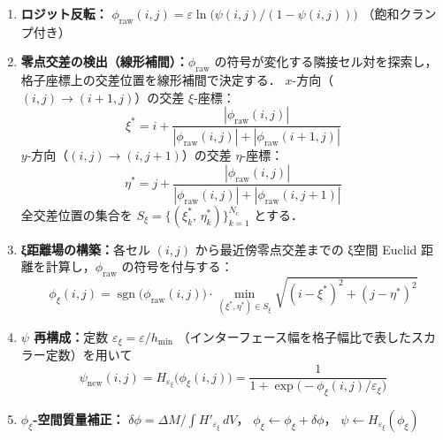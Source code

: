 \begin{tcolorbox}[algbox, title={ξ-SDF 再初期化アルゴリズム (Strategy B)}]
\begin{enumerate}
  \item \textbf{ロジット反転：}
        $\phi_{\mathrm{raw}}(i,j) = \varepsilon\ln\!\bigl(\psi(i,j)/(1{-}\psi(i,j))\bigr)$
        （飽和クランプ付き）
  \item \textbf{零点交差の検出（線形補間）：}$\phi_{\mathrm{raw}}$ の符号が変化する隣接セル対を探索し，
        格子座標上の交差位置を線形補間で決定する．
        $x$-方向（$(i,j)\to(i{+}1,j)$）の交差 $\xi$-座標：
        \begin{equation}
          \xi^* = i + \frac{|\phi_{\mathrm{raw}}(i,j)|}{|\phi_{\mathrm{raw}}(i,j)| + |\phi_{\mathrm{raw}}(i{+}1,j)|}
          \label{eq:xi_crossing_x}
        \end{equation}
        $y$-方向（$(i,j)\to(i,j{+}1)$）の交差 $\eta$-座標：
        \begin{equation}
          \eta^* = j + \frac{|\phi_{\mathrm{raw}}(i,j)|}{|\phi_{\mathrm{raw}}(i,j)| + |\phi_{\mathrm{raw}}(i,j{+}1)|}
          \label{eq:xi_crossing_y}
        \end{equation}
        全交差位置の集合を $S_\xi = \{(\xi^*_k,\,\eta^*_k)\}_{k=1}^{N_c}$ とする．
  \item \textbf{ξ距離場の構築：}各セル $(i,j)$ から最近傍零点交差までの
        ξ空間 Euclid 距離を計算し，$\phi_{\mathrm{raw}}$ の符号を付与する：
        \begin{equation}
          \phi_\xi(i,j) = \operatorname{sgn}\!\bigl(\phi_{\mathrm{raw}}(i,j)\bigr)
          \cdot \min_{(\xi^*,\eta^*)\in S_\xi}
          \sqrt{(i-\xi^*)^2 + (j-\eta^*)^2}
          \label{eq:xi_sdf}
        \end{equation}
  \item \textbf{$\psi$ 再構成：}定数 $\varepsilon_\xi = \varepsilon/h_{\min}$
        （インターフェース幅を格子幅比で表したスカラー定数）を用いて
        \begin{equation}
          \psi_{\mathrm{new}}(i,j) = H_{\varepsilon_\xi}\!\bigl(\phi_\xi(i,j)\bigr)
          = \frac{1}{1+\exp\!\bigl(-\phi_\xi(i,j)/\varepsilon_\xi\bigr)}
          \label{eq:xi_sdf_psi}
        \end{equation}
  \item \textbf{$\phi_\xi$-空間質量補正：}
        $\delta\phi = \Delta M / \int H'_{\varepsilon_\xi}\,dV$，
        $\phi_\xi \leftarrow \phi_\xi + \delta\phi$，
        $\psi \leftarrow H_{\varepsilon_\xi}(\phi_\xi)$
\end{enumerate}
\end{tcolorbox}

